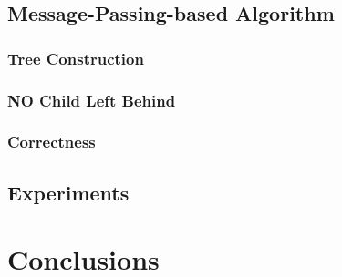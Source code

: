 \documentclass[10pt]{beamer}
\begin{document}




\subsection[Algorithm3]{Message-Passing-based Algorithm}


\subsubsection[Algorithm3: Tree]{Tree Construction}

\subsubsection[Algorithm3: Motion Strategy]{NO Child Left Behind}

\subsubsection[Algorithm3: Correctness]{Correctness}

\subsection[Experiments]{Experiments}

\section{Conclusions}



\end{document}
